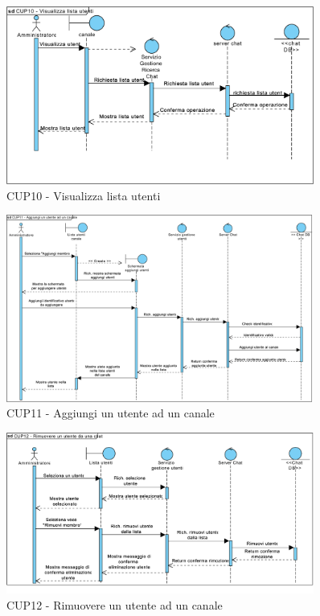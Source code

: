 \begin{figure}
	\centering
	\includegraphics[width=0.9\textwidth]{imgs/gruppo6/sequence/CUP10_visualizza_lista_utenti.pdf}
	\caption{CUP10 - Visualizza lista utenti}
	\label{fig:seq-cup10}
\end{figure}

\begin{figure}
	\centering
	\includegraphics[width=0.9\textwidth]{imgs/gruppo6/sequence/CUP11_aggiungi_un_utente_ad_un_canale.pdf}
	\caption{CUP11 - Aggiungi un utente ad un canale}
	\label{fig:seq-cup11}
\end{figure}

\begin{figure}
	\centering
	\includegraphics[width=0.9\textwidth]{imgs/gruppo6/sequence/CUP12_rimuovere_un_utente_da_un_canale.pdf}
	\caption{CUP12 - Rimuovere un utente ad un canale}
	\label{fig:seq-cup12}
\end{figure}

